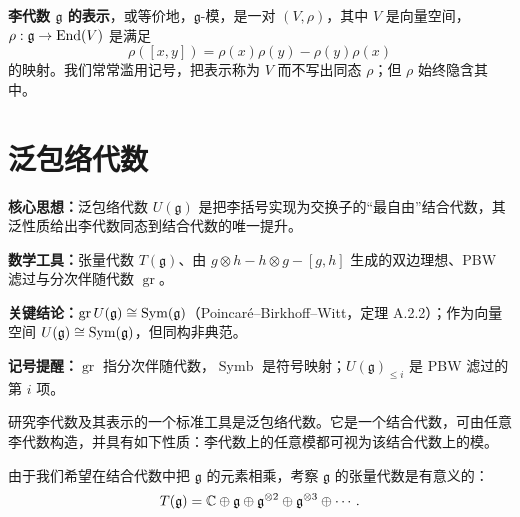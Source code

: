 
\textbf{李代数 $\mathfrak g$ 的表示}，或等价地，$\mathfrak g$-模，是一对 $(V,\rho)$，其中 $V$ 是向量空间，$\rho:\mathfrak g\to\operatorname{End}(V)$ 是满足
\[
    \rho([x,y])=\rho(x)\rho(y)-\rho(y)\rho(x)
\]
的映射。我们常常滥用记号，把表示称为 $V$ 而不写出同态 $\rho$；但 $\rho$ 始终隐含其中。


\section{泛包络代数}

\begin{keypoints}
    \item \textbf{核心思想：}泛包络代数 $U(\mathfrak g)$ 是把李括号实现为交换子的“最自由”结合代数，其泛性质给出李代数同态到结合代数的唯一提升。
    \item \textbf{数学工具：}张量代数 $T(\mathfrak g)$、由 $g\otimes h-h\otimes g-[g,h]$ 生成的双边理想、PBW 滤过与分次伴随代数 $\operatorname{gr}$。
    \item \textbf{关键结论：}$\operatorname{gr}U(\mathfrak g)\cong\operatorname{Sym}(\mathfrak g)$（Poincaré--Birkhoff--Witt，定理 A.2.2）；作为向量空间 $U(\mathfrak g)\cong\operatorname{Sym}(\mathfrak g)$，但同构非典范。
    \item \textbf{记号提醒：}$\operatorname{gr}$ 指分次伴随代数，$\operatorname{Symb}$ 是符号映射；$U(\mathfrak g)_{\le i}$ 是 PBW 滤过的第 $i$ 项。
\end{keypoints}


研究李代数及其表示的一个标准工具是泛包络代数。它是一个结合代数，可由任意李代数构造，并具有如下性质：李代数上的任意模都可视为该结合代数上的模。

由于我们希望在结合代数中把 $\mathfrak g$ 的元素相乘，考察 $\mathfrak g$ 的张量代数是有意义的：
\[
    T(\mathfrak g)=\mathbb{C}\oplus\mathfrak g\oplus\mathfrak g^{\otimes 2}\oplus\mathfrak g^{\otimes 3}\oplus\cdots .
\]

